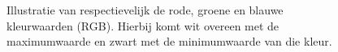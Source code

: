 \documentclass[a4paper,kulak]{kulakarticle}
\begin{document}
	\begin{figure}[H]
	\centering
	\qquad
	\qquad
	\caption{Illustratie van respectievelijk de rode, groene en blauwe kleurwaarden (RGB). Hierbij komt wit overeen met de maximumwaarde en zwart met de minimumwaarde van die kleur.}
	\label{figuur RGB}
	\end{figure}
\end{document}

